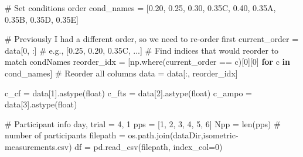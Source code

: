 \documentclass[
  11pt,
  a4paper]{article}
\newenvironment{Shaded}{\begin{snugshade}}{\end{snugshade}}
\newcommand{\BuiltInTok}[1]{\textcolor[rgb]{0.00,0.23,0.31}{#1}}
\newcommand{\CommentTok}[1]{\textcolor[rgb]{0.37,0.37,0.37}{#1}}
\newcommand{\ControlFlowTok}[1]{\textcolor[rgb]{0.00,0.23,0.31}{\textbf{#1}}}
\newcommand{\DecValTok}[1]{\textcolor[rgb]{0.68,0.00,0.00}{#1}}
\newcommand{\KeywordTok}[1]{\textcolor[rgb]{0.00,0.23,0.31}{\textbf{#1}}}
\newcommand{\NormalTok}[1]{\textcolor[rgb]{0.00,0.23,0.31}{#1}}
\newcommand{\OperatorTok}[1]{\textcolor[rgb]{0.37,0.37,0.37}{#1}}
\newcommand{\StringTok}[1]{\textcolor[rgb]{0.13,0.47,0.30}{#1}}
\begin{document}
\begin{Shaded}
\begin{Highlighting}[]
\CommentTok{\# Set conditions order}
\NormalTok{cond\_names }\OperatorTok{=}\NormalTok{ [}\StringTok{\textquotesingle{}0.20\textquotesingle{}}\NormalTok{, }\StringTok{\textquotesingle{}0.25\textquotesingle{}}\NormalTok{, }\StringTok{\textquotesingle{}0.30\textquotesingle{}}\NormalTok{, }\StringTok{\textquotesingle{}0.35C\textquotesingle{}}\NormalTok{, }\StringTok{\textquotesingle{}0.40\textquotesingle{}}\NormalTok{, }\StringTok{\textquotesingle{}0.35A\textquotesingle{}}\NormalTok{, }\StringTok{\textquotesingle{}0.35B\textquotesingle{}}\NormalTok{, }\StringTok{\textquotesingle{}0.35D\textquotesingle{}}\NormalTok{, }\StringTok{\textquotesingle{}0.35E\textquotesingle{}}\NormalTok{]}

\CommentTok{\# Previously I had a different order, so we need to re{-}order first}
\NormalTok{current\_order }\OperatorTok{=}\NormalTok{ data[}\DecValTok{0}\NormalTok{, :]  }\CommentTok{\# e.g., [\textquotesingle{}0.25\textquotesingle{}, \textquotesingle{}0.20\textquotesingle{}, \textquotesingle{}0.35C\textquotesingle{}, ...]}
\CommentTok{\# Find indices that would reorder to match condNames}
\NormalTok{reorder\_idx }\OperatorTok{=}\NormalTok{ [np.where(current\_order }\OperatorTok{==}\NormalTok{ c)[}\DecValTok{0}\NormalTok{][}\DecValTok{0}\NormalTok{] }\ControlFlowTok{for}\NormalTok{ c }\KeywordTok{in}\NormalTok{ cond\_names]}
\CommentTok{\# Reorder all columns}
\NormalTok{data }\OperatorTok{=}\NormalTok{ data[:, reorder\_idx]}

\NormalTok{c\_cf }\OperatorTok{=}\NormalTok{ data[}\DecValTok{1}\NormalTok{].astype(}\BuiltInTok{float}\NormalTok{)}
\NormalTok{c\_fts }\OperatorTok{=}\NormalTok{ data[}\DecValTok{2}\NormalTok{].astype(}\BuiltInTok{float}\NormalTok{)}
\NormalTok{c\_ampo }\OperatorTok{=}\NormalTok{ data[}\DecValTok{3}\NormalTok{].astype(}\BuiltInTok{float}\NormalTok{)}

\CommentTok{\# Participant info}
\NormalTok{day, trial }\OperatorTok{=} \DecValTok{4}\NormalTok{, }\DecValTok{1}
\NormalTok{pps }\OperatorTok{=}\NormalTok{ [}\DecValTok{1}\NormalTok{, }\DecValTok{2}\NormalTok{, }\DecValTok{3}\NormalTok{, }\DecValTok{4}\NormalTok{, }\DecValTok{5}\NormalTok{, }\DecValTok{6}\NormalTok{]}
\NormalTok{Npp }\OperatorTok{=} \BuiltInTok{len}\NormalTok{(pps)  }\CommentTok{\# number of participants}
\NormalTok{filepath }\OperatorTok{=}\NormalTok{ os.path.join(dataDir,}\StringTok{\textquotesingle{}isometric{-}measurements.csv\textquotesingle{}}\NormalTok{)}
\NormalTok{df }\OperatorTok{=}\NormalTok{ pd.read\_csv(filepath, index\_col}\OperatorTok{=}\DecValTok{0}\NormalTok{)}


\end{Highlighting}
\end{Shaded}
\end{document}
